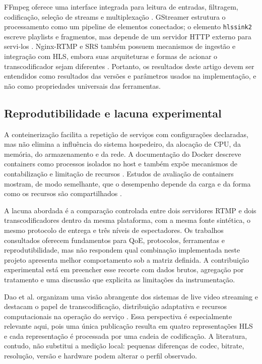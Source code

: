 FFmpeg oferece uma interface integrada para leitura de entradas, filtragem, codificação, seleção de streams e multiplexação \citep{ffmpeg}. GStreamer estrutura o processamento como um pipeline de elementos conectados; o elemento \texttt{hlssink2} escreve playlists e fragmentos, mas depende de um servidor HTTP externo para servi-los \citep{gstreamer,gstreamerhls}. Nginx-RTMP e SRS também possuem mecanismos de ingestão e integração com HLS, embora suas arquiteturas e formas de acionar o transcodificador sejam diferentes \citep{nginxrtmp,srs}. Portanto, os resultados deste artigo devem ser entendidos como resultados das versões e parâmetros usados na implementação, e não como propriedades universais das ferramentas.

\subsection{Reprodutibilidade e lacuna experimental}

A conteinerização facilita a repetição de serviços com configurações declaradas, mas não elimina a influência do sistema hospedeiro, da alocação de CPU, da memória, do armazenamento e da rede. A documentação do Docker descreve containers como processos isolados no host e também expõe mecanismos de contabilização e limitação de recursos \citep{docker}. Estudos de avaliação de containers mostram, de modo semelhante, que o desempenho depende da carga e da forma como os recursos são compartilhados \citep{shirinbab}.

A lacuna abordada é a comparação controlada entre dois servidores RTMP e dois transcodificadores dentro da mesma plataforma, com a mesma fonte sintética, o mesmo protocolo de entrega e três níveis de espectadores. Os trabalhos consultados oferecem fundamentos para QoE, protocolos, ferramentas e reprodutibilidade, mas não respondem qual combinação implementada neste projeto apresenta melhor comportamento sob a matriz definida. A contribuição experimental está em preencher esse recorte com dados brutos, agregação por tratamento e uma discussão que explicita as limitações da instrumentação.

Dao et al. organizam uma visão abrangente dos sistemas de live video streaming e destacam o papel de transcodificação, distribuição adaptativa e recursos computacionais na operação do serviço \citep{dao}. Essa perspectiva é especialmente relevante aqui, pois uma única publicação resulta em quatro representações HLS e cada representação é processada por uma cadeia de codificação. A literatura, contudo, não substitui a medição local: pequenas diferenças de codec, bitrate, resolução, versão e hardware podem alterar o perfil observado.
